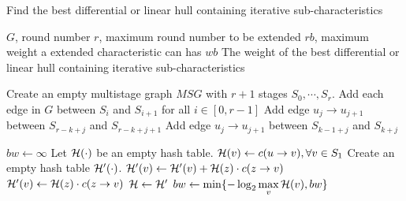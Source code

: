 \begin{algorithm}
	\caption{Find the best differential or linear hull containing iterative sub-characteristics}
	\label{algo:msg}
	\begin{algorithmic}[1]
        \Require $G$, round number $r$, maximum round number to be extended $rb$, maximum weight a extended characteristic can has $wb$
        \Ensure The weight of the best differential or linear hull containing iterative sub-characteristics
        \Procedure {}{}
        
        \State Create an empty multistage graph $MSG$ with $r+1$ stages $S_0,\cdots,S_r$.
        \State Add each edge in $G$ between $S_i$ and $S_{i+1}$ for all $i\in[0,r-1]$
        \State Add edge $u_j\rightarrow u_{j+1}$ between $S_{r-k+j}$ and $S_{r-k+j+1}$
        \EndFor
        \State Add edge $u_j\rightarrow u_{j+1}$ between $S_{k-1+j}$ and $S_{k+j}$
        \EndFor

        \State $bw\leftarrow\infty$
        \State Let $\mathcal{H}(\cdot)$ be an empty hash table. 
        \State $\mathcal{H}(v)\leftarrow c(u\rightarrow v),\forall v\in S_1$
        \State Create an empty hash table $\mathcal{H}'(\cdot)$.
        \State $\mathcal{H}'(v)\leftarrow\mathcal{H}'(v)+\mathcal{H}(z)\cdot c(z\rightarrow v)$
        \Else
        \State $\mathcal{H}'(v)\leftarrow\mathcal{H}(z)\cdot c(z\rightarrow v)$
        \EndIf
        \EndFor
        \State $\mathcal{H}\leftarrow \mathcal{H}'$
        \EndFor
        \State $bw\leftarrow\min\{-\log_2\max\limits_{v}\mathcal{H}(v),bw\}$
        \EndFor
        \State {}
        \EndProcedure
	\end{algorithmic}
\end{algorithm}
